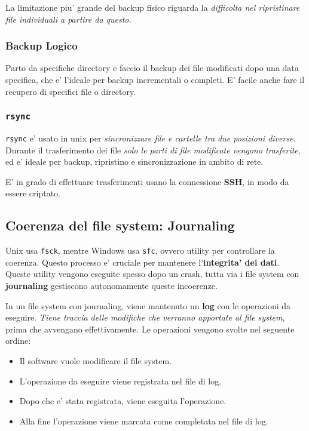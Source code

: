 La limitazione piu' grande del backup fisico riguarda la \textit{difficolta nel ripristinare file individuali a partire da questo.}

\subsubsection{Backup Logico}
Parto da specifiche directory e faccio il backup dei file modificati dopo una data specifica,
che e' l'ideale per backup incrementali o completi. E' facile anche fare il recupero di specifici file o directory.

\subsubsection{\texttt{rsync}}
\texttt{rsync} e' usato in unix per \textit{sincronizzare file e cartelle tra due posizioni diverse}.
Durante il trasferimento dei file \textit{solo le parti di file modificate vengono trasferite}, ed e' ideale per backup, ripristino e sincronizzazione
in ambito di rete.

E' in grado di effettuare trasferimenti usano la connessione \textbf{SSH}, in modo da essere criptato.

\subsection{Coerenza del file system: Journaling}
Unix usa \texttt{fsck}, mentre Windows usa \texttt{sfc}, ovvero utility per controllare la coerenza.
Questo processo e' cruciale per mantenere l'\textbf{integrita' dei dati}. Queste utility vengono eseguite spesso
dopo un crash, tutta via i file system con \textbf{journaling} gestiscono autonomamente queste incoerenze.

In un file system con journaling, viene mantenuto un \textbf{log} con le operazioni da eseguire. \textit{Tiene traccia
delle modifiche che verranno apportate al file system}, prima che avvengano effettivamente.
Le operazioni vengono svolte nel seguente ordine:
\begin{itemize}
    \item Il software vuole modificare il file system.
    \item L'operazione da eseguire viene registrata nel file di log.
    \item Dopo che e' stata registrata, viene eseguita l'operazione.
    \item Alla fine l'operazione viene marcata come completata nel file di log.
\end{itemize}

